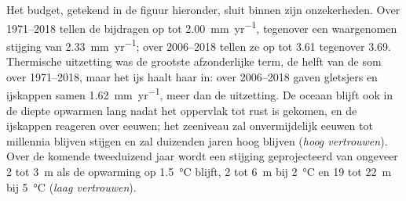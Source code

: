 Het budget, getekend in de figuur hieronder, sluit binnen zijn onzekerheden. Over 1971--2018 tellen de bijdragen op tot
\qty{2.00}{mm.yr^{-1}}, tegenover een waargenomen stijging van \qty{2.33}{mm.yr^{-1}}; over 2006--2018 tellen ze
op tot 3.61 tegenover 3.69. Thermische uitzetting was de grootste afzonderlijke term, de helft van de som over 1971--2018, maar het ijs
haalt haar in: over 2006--2018 gaven gletsjers en ijskappen samen \qty{1.62}{mm.yr^{-1}}, meer dan
de uitzetting. De oceaan blijft ook in de diepte opwarmen lang nadat het oppervlak tot rust is gekomen, en de
ijskappen reageren over eeuwen; het zeeniveau zal onvermijdelijk eeuwen tot millennia blijven stijgen en zal
duizenden jaren hoog blijven (\emph{hoog vertrouwen}). Over de komende tweeduizend jaar wordt een
stijging geprojecteerd van ongeveer 2 tot \qty{3}{m} als de opwarming op \qty{1.5}{\celsius} blijft, 2 tot
\qty{6}{m} bij \qty{2}{\celsius} en 19 tot \qty{22}{m} bij \qty{5}{\celsius} (\emph{laag vertrouwen}).

